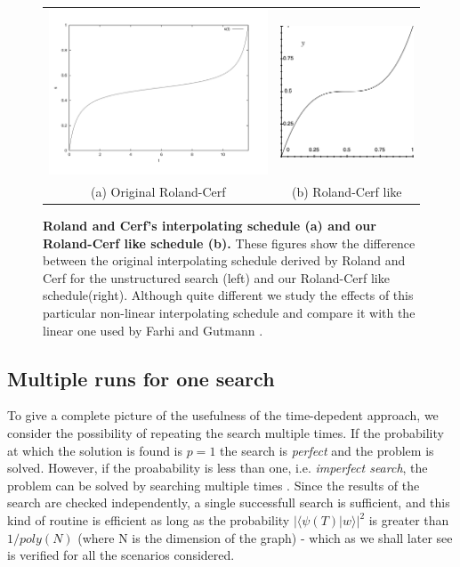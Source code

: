         \begin{figure}[ht]
          \centering
          \begin{tabular}{cc}
            \includegraphics[width=75mm]{./figures/interpolating_schedules/cerf} &   \includegraphics[width=45mm]{./figures/interpolating_schedules/our_cerf} \\
          (a) Original Roland-Cerf & (b) Roland-Cerf like\\[6pt]
          \end{tabular}
          \caption[Roland and Cerf's interpolating schedules for the unstructured search and our non-linear schedule]{\textbf{Roland and Cerf's interpolating schedule (a) and our Roland-Cerf like schedule (b).} These figures show the difference between the original interpolating schedule derived by Roland and Cerf for the unstructured search (left) and our Roland-Cerf like schedule(right). Although quite different we study the effects of this particular non-linear interpolating schedule and compare it with the linear one used by Farhi and Gutmann \cite{Farhi2000}.}
          \label{cerf}
        \end{figure}

        \subsection{Multiple runs for one search}
        To give a complete picture of the usefulness of the time-depedent approach, we consider the possibility of repeating the search multiple times. If the probability at which the solution is found is $p=1$ the search is \textit{perfect} and the problem is solved. However, if the proabability is less than one, i.e. \textit{imperfect search}, the problem can be solved by searching multiple times . Since the results of the search are checked independently, a single successfull search is sufficient, and this kind of routine is efficient as long as the probability $\big|\langle\psi(T)| w\rangle\big|^2$ is greater than $1/poly(N)$ (where N is the dimension of the graph) \cite{Morley2018} - which as we shall later see is verified for all the scenarios considered.

